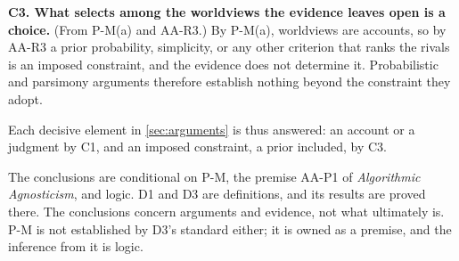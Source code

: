 \medskip\noindent\textbf{C3. What selects among the worldviews the evidence leaves open is a
choice.}\label{item:C3}
(From P-M(a) and AA-R3.)
By P-M(a), worldviews are accounts, so by AA-R3 a prior probability, simplicity, or any other
criterion that ranks the rivals is an imposed constraint, and the evidence does not determine it.
Probabilistic and parsimony arguments therefore establish nothing beyond the constraint they adopt.

Each decisive element in \cref{sec:arguments} is thus answered: an account or a judgment by C1,
and an imposed constraint, a prior included, by C3.

The conclusions are conditional on P-M, the premise AA-P1 of \emph{Algorithmic Agnosticism}, and logic. D1 and D3
are definitions, and its results are proved there. The conclusions concern
arguments and evidence, not what ultimately is. P-M is not established by D3's standard either;
it is owned as a premise, and the inference from it is logic.
